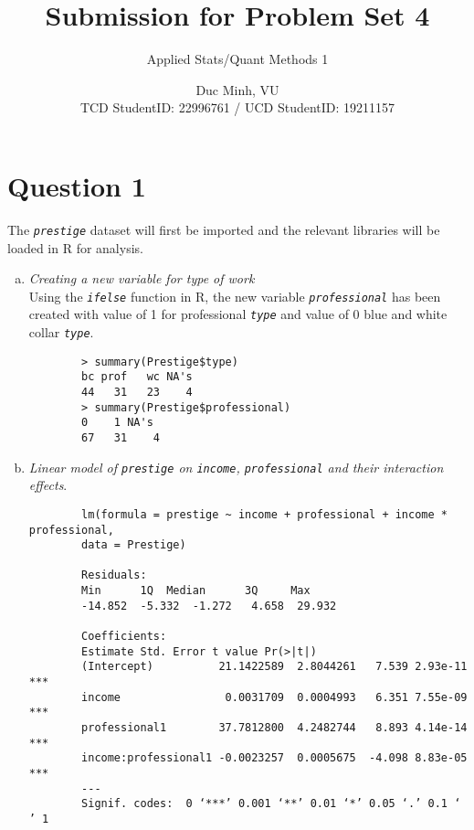 \documentclass[12pt,letterpaper]{article}
\title{Submission for Problem Set 4}
\date{Duc Minh, VU \\
	TCD StudentID: 22996761 / UCD StudentID: 19211157}
\author{Applied Stats/Quant Methods 1}
\begin{document}
	\maketitle
	\section{Question 1} 
	\noindent The \textit{\texttt{prestige}} dataset will first be imported and the relevant libraries will be loaded in R for analysis.
	
	\begin{enumerate}[(a)]
		\item \textit{Creating a new variable for type of work} \\
		Using the \textit{\texttt{ifelse}} function in R, the new variable  \textit{\texttt{professional}} has been created with value of 1 for professional \textit{\texttt{type}} and value of 0 blue and white collar \textit{\texttt{type}}.
		
		\begin{verbatim}
		> summary(Prestige$type)
		bc prof   wc NA's 
		44   31   23    4 
		> summary(Prestige$professional)
		0    1 NA's 
		67   31    4
		\end{verbatim}
	
		\item \textit{Linear model of \textit{\texttt{prestige}} on \textit{\texttt{income}}, \textit{\texttt{professional}} and their interaction effects}. \\
		
		\begin{verbatim}
		lm(formula = prestige ~ income + professional + income * professional, 
		data = Prestige)
		
		Residuals:
		Min      1Q  Median      3Q     Max 
		-14.852  -5.332  -1.272   4.658  29.932 
		
		Coefficients:
		Estimate Std. Error t value Pr(>|t|)    
		(Intercept)          21.1422589  2.8044261   7.539 2.93e-11 ***
		income                0.0031709  0.0004993   6.351 7.55e-09 ***
		professional1        37.7812800  4.2482744   8.893 4.14e-14 ***
		income:professional1 -0.0023257  0.0005675  -4.098 8.83e-05 ***
		---
		Signif. codes:  0 ‘***’ 0.001 ‘**’ 0.01 ‘*’ 0.05 ‘.’ 0.1 ‘ ’ 1
		

\end{verbatim}
\end{enumerate}
\end{document}
